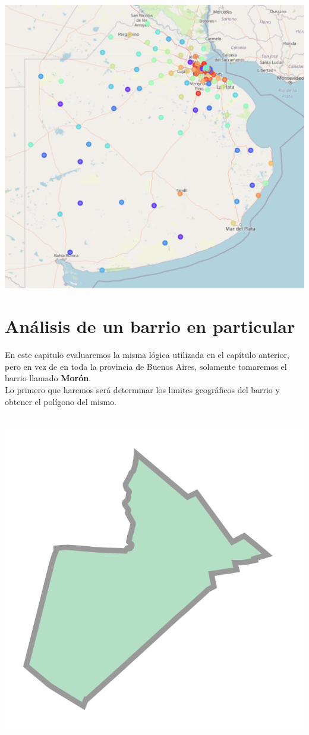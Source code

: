 \documentclass[12pt,a4paper]{tesis}
\begin{document}
\centerline{
	\includegraphics[scale=0.4]{mapa10}
}

\chapter{Análisis de un barrio en particular}
En este capitulo evaluaremos la misma lógica utilizada en el capítulo anterior, pero en vez de en toda la provincia de Buenos Aires, solamente tomaremos el barrio llamado \textbf{Morón}. \\ 

Lo primero que haremos será determinar los limites geográficos del barrio y obtener el polígono del mismo. \\ \\

\centerline{
	\includegraphics[scale=0.5]{moron}
}
\end{document}
